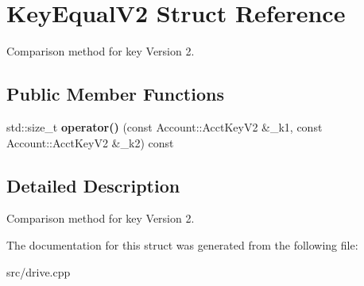 \hypertarget{structKeyEqualV2}{}\section{Key\+Equal\+V2 Struct Reference}
\label{structKeyEqualV2}


Comparison method for key Version 2.  


\subsection*{Public Member Functions}
\begin{DoxyCompactItemize}
\item 
std\+::size\+\_\+t {\bfseries operator()} (const Account\+::\+Acct\+Key\+V2 \&\+\_\+k1, const Account\+::\+Acct\+Key\+V2 \&\+\_\+k2) const \hypertarget{structKeyEqualV2_a891ec45459b6188150b612fb4a3a1ac7}{}\label{structKeyEqualV2_a891ec45459b6188150b612fb4a3a1ac7}

\end{DoxyCompactItemize}


\subsection{Detailed Description}
Comparison method for key Version 2. 

The documentation for this struct was generated from the following file\+:\begin{DoxyCompactItemize}
\item 
src/drive.\+cpp\end{DoxyCompactItemize}
